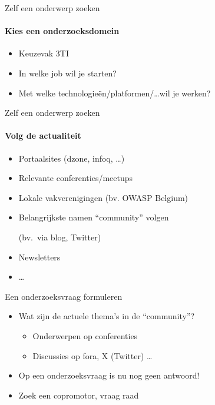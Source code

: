 \documentclass[aspectratio=169]{beamer}
\begin{document}
\begin{frame}{Zelf een onderwerp zoeken}
  \framesubtitle{Kies een onderzoeksdomein}

  \begin{itemize}
    \item Keuzevak 3TI
    \item In welke job wil je starten?
    \item Met welke technologieën/platformen/\ldots wil je werken?
  \end{itemize}

\end{frame}

\begin{frame}{Zelf een onderwerp zoeken}
  \framesubtitle{Volg de actualiteit}

  \begin{itemize}
    \item Portaalsites (dzone, infoq, \ldots)
    \item Relevante conferenties/meetups
    \item Lokale vakverenigingen (bv. OWASP Belgium)
    \item Belangrijkste namen ``community'' volgen

          (bv.\ via blog, Twitter)

    \item Newsletters
    \item \ldots
  \end{itemize}

\end{frame}

\begin{frame}{Een onderzoeksvraag formuleren}

  \begin{itemize}
    \item Wat zijn de actuele thema's in de ``community''?
          \begin{itemize}
            \item Onderwerpen op conferenties
            \item Discussies op fora, X (Twitter) \ldots
          \end{itemize}
    \item Op een onderzoeksvraag is nu nog geen antwoord!
    \item Zoek een copromotor, vraag raad
  \end{itemize}

\end{frame}
\end{document}
